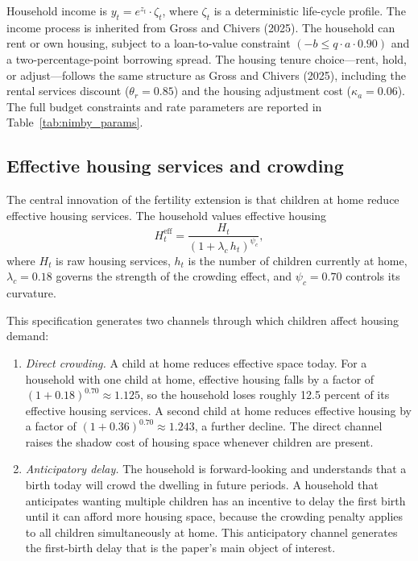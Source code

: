 Household income is $y_t = e^{z_t} \cdot \zeta_t$, where $\zeta_t$ is a deterministic life-cycle profile. The income process is inherited from Gross and Chivers (2025). The household can rent or own housing, subject to a loan-to-value constraint $(-b \leq q \cdot a \cdot 0.90)$ and a two-percentage-point borrowing spread. The housing tenure choice---rent, hold, or adjust---follows the same structure as Gross and Chivers (2025), including the rental services discount ($\theta_r = 0.85$) and the housing adjustment cost ($\kappa_a = 0.06$). The full budget constraints and rate parameters are reported in Table~\ref{tab:nimby_params}.

\subsection{Effective housing services and crowding}

The central innovation of the fertility extension is that children at home reduce effective housing services. The household values effective housing
\begin{equation}\label{eq:crowding}
H_t^{\text{eff}} = \frac{H_t}{(1 + \lambda_c \, h_t)^{\psi_c}},
\end{equation}
where $H_t$ is raw housing services, $h_t$ is the number of children currently at home, $\lambda_c = 0.18$ governs the strength of the crowding effect, and $\psi_c = 0.70$ controls its curvature.

This specification generates two channels through which children affect housing demand:

\begin{enumerate}
\item \textit{Direct crowding.} A child at home reduces effective space today. For a household with one child at home, effective housing falls by a factor of $(1 + 0.18)^{0.70} \approx 1.125$, so the household loses roughly 12.5 percent of its effective housing services. A second child at home reduces effective housing by a factor of $(1 + 0.36)^{0.70} \approx 1.243$, a further decline. The direct channel raises the shadow cost of housing space whenever children are present.

\item \textit{Anticipatory delay.} The household is forward-looking and understands that a birth today will crowd the dwelling in future periods. A household that anticipates wanting multiple children has an incentive to delay the first birth until it can afford more housing space, because the crowding penalty applies to all children simultaneously at home. This anticipatory channel generates the first-birth delay that is the paper's main object of interest.
\end{enumerate}


